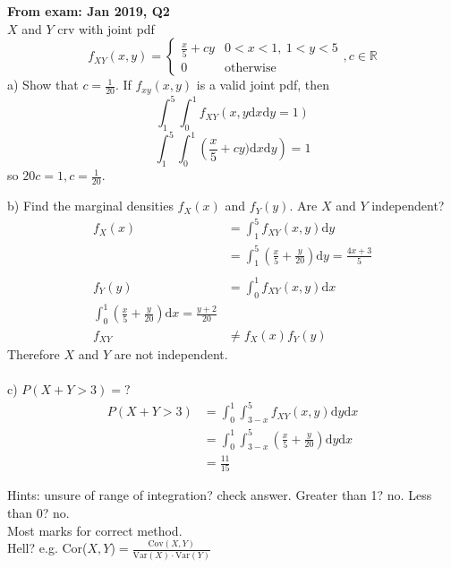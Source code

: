 \documentclass{article}
\theoremstyle{definition}
\theoremstyle{remark}
\theoremstyle{example}
\renewcommand{\d}{\mathrm{d}}
\newcommand{\R}{\mathbb{R}}
\newcommand{\Var}[1]{\mathrm{Var}\left(#1\right)}
\newcommand{\Cov}[1]{\mathrm{Cov}\left(#1\right)}
\begin{document}
	\textbf{From exam: Jan 2019, Q2}\\
	$X$ and $Y$ crv with joint pdf \[f_{XY}(x,y)=\begin{cases}
		\frac{x}{5}+cy & 0 < x < 1,\ 1 < y < 5\\
		0 & \mathrm{otherwise}
	\end{cases}, c \in \R\]
	a) Show that $c = \frac{1}{20}$.
	If $f_{xy}(x,y)$ is a valid joint pdf, then \[\int_{1}^{5} \int_{0}^{1} f_{XY}(x,y \d x \d y = 1)\]
	\[ \int_{1}^{5} \int_0^1\left(\frac{x}{5}+cy) \d x \d y\right) = 1\]
	so $20c = 1, c = \frac1{20}$.
	
	b) Find the marginal densities $f_X(x)$ and $f_Y(y)$. Are $X$ and $Y$ independent?
	\begin{align*}
		f_X(x)&=\int_1^5f_{XY}(x,y)\d y\\
		&=\int_1^5\left(\frac{x}{5} + \frac{y}{20}\right) \d y = \frac{4x+3}{5}\\
		\\
		f_Y(y)&=\int_0^1 f_{XY}(x,y) \d x\\
		\int_0^1\left(\frac{x}{5}+\frac{y}{20}\right) \d x = \frac{y+2}{20}\\
		f_{XY}\ & \neq f_X(x)f_Y(y)
	\end{align*}
	Therefore $X$ and $Y$ are not independent.\\
	\\
	c) $P(X+Y > 3)=?$
	\begin{align*}
		P(X+Y>3)&=\int_0^1 \int_{3-x}^5 f_{XY}(x,y) \d y \d x\\
		&= \int_0^1 \int_{3-x}^5 \left(\frac{x}{5}+\frac{y}{20}\right)\d y \d x\\
		&= \frac{11}{15}
	\end{align*}
	
	Hints: unsure of range of integration? check answer. Greater than 1? no. Less than 0? no. \\
	Most marks for correct method.\\
	Hell? e.g. Cor($X,Y$)$=\frac{\Cov{X,Y}}{\Var{X}\cdot \Var{Y}}$
\end{document}
